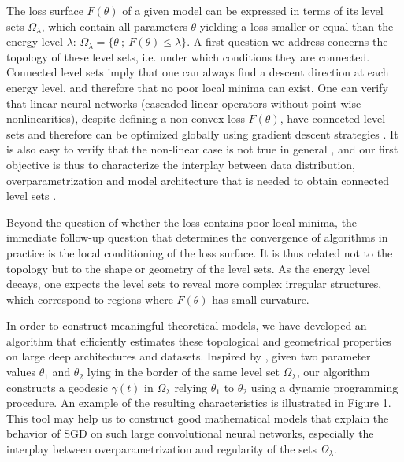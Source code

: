 \documentclass[10pt]{article}
\begin{document}
The loss surface $F(\theta)$ of a given model can be expressed in terms of its level sets $\Omega_\lambda$, which contain all parameters $\theta$ yielding a loss smaller or equal than the energy level $\lambda$: $\Omega_\lambda = \{ \theta ~;~F(\theta) \leq \lambda\}$. 
A first question we address concerns the topology of these level sets, i.e. under which conditions they are connected. Connected level sets imply that one can always find a descent direction at each energy level, and therefore that no poor local minima can exist. One can verify that linear neural networks (cascaded linear operators without point-wise nonlinearities), despite defining a non-convex loss $F(\theta)$, have connected level sets and therefore can be optimized globally using gradient descent strategies \cite{danieljoan}. It is also easy to verify that the non-linear case is not true in general \cite{shamir}, and our first objective is thus to characterize the interplay between data distribution, overparametrization and model architecture that is needed to obtain connected level sets \cite{danieljoan}.

Beyond the question of whether the loss contains poor local minima, the immediate follow-up question that determines the convergence of algorithms in practice is the local conditioning of the loss surface. It is thus related not to the topology but to the shape or geometry of the level sets. As the energy level decays, one expects the level sets to reveal more complex irregular structures, which correspond to regions where $F(\theta)$ has small curvature.

In order to construct meaningful theoretical models, we have developed an algorithm \cite{danieljoan} that efficiently estimates these topological and geometrical properties on large deep architectures and datasets. Inspired by \cite{goodfellow2014qualitatively}, given two parameter values $\theta_1$ and $\theta_2$ lying in the border of the same level set $\Omega_\lambda$, our algorithm constructs a geodesic $\gamma(t)$ in $\Omega_\lambda$ relying $\theta_1$ to $\theta_2$ using a dynamic programming procedure. An example of the resulting characteristics is illustrated in Figure 1. This tool may help us to construct good mathematical models that explain the behavior of SGD on such large convolutional neural networks, especially the interplay between overparametrization and regularity of the sets $\Omega_\lambda$.
\end{document}
